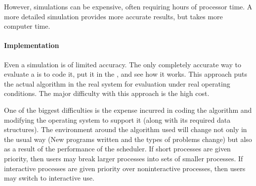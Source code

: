 However, simulations can be expensive, often requiring hours of processor time.
A more detailed simulation provides more accurate results, but takes more computer time.

\paragraph{Implementation}\label{par:Implementation}
Even a simulation is of limited accuracy.
The only completely accurate way to evaluate a  is to code it, put it in the , and see how it works.
This approach puts the actual algorithm in the real system for evaluation under real operating conditions.
The major difficulty with this approach is the high cost.

One of the biggest difficulties is the expense incurred in coding the algorithm and modifying the operating system to support it (along with its required data structures).
The environment around the algorithm used will change not only in the usual way (New programs written and the types of problems change) but also as a result of the performance of the scheduler.
If short processes are given priority, then users may break larger processes into sets of smaller processes.
If interactive processes are given priority over noninteractive processes, then users may switch to interactive use.

